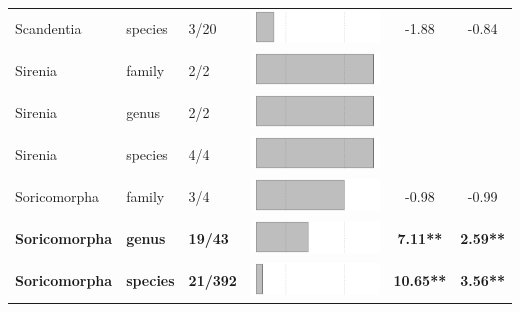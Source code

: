 \begin{longtable}{lL{1.8cm}C{2cm}lcc}
  Scandentia & species & 3/20 & \includegraphics[width=0.20\linewidth, height=0.05\linewidth]{Supplementaries/Figures/MissingMammals/Results_1c/Table_figures/bar75.pdf} & -1.88 & -0.84 \\ 
  Sirenia & family & 2/2 & \includegraphics[width=0.20\linewidth, height=0.05\linewidth]{Supplementaries/Figures/MissingMammals/Results_1c/Table_figures/bar76.pdf} &   &   \\ 
  Sirenia & genus & 2/2 & \includegraphics[width=0.20\linewidth, height=0.05\linewidth]{Supplementaries/Figures/MissingMammals/Results_1c/Table_figures/bar77.pdf} &   &   \\ 
  Sirenia & species & 4/4 & \includegraphics[width=0.20\linewidth, height=0.05\linewidth]{Supplementaries/Figures/MissingMammals/Results_1c/Table_figures/bar78.pdf} &   &   \\ 
  Soricomorpha & family & 3/4 & \includegraphics[width=0.20\linewidth, height=0.05\linewidth]{Supplementaries/Figures/MissingMammals/Results_1c/Table_figures/bar79.pdf} & -0.98 & -0.99 \\ 
  \textbf{Soricomorpha} & \textbf{genus} & \textbf{19/43} & \includegraphics[width=0.20\linewidth, height=0.05\linewidth]{Supplementaries/Figures/MissingMammals/Results_1c/Table_figures/bar80.pdf} & \textbf{7.11**} & \textbf{2.59**} \\ 
  \textbf{Soricomorpha} & \textbf{species} & \textbf{21/392} & \includegraphics[width=0.20\linewidth, height=0.05\linewidth]{Supplementaries/Figures/MissingMammals/Results_1c/Table_figures/bar81.pdf} & \textbf{10.65**} & \textbf{3.56**} \\ 

\end{longtable}
